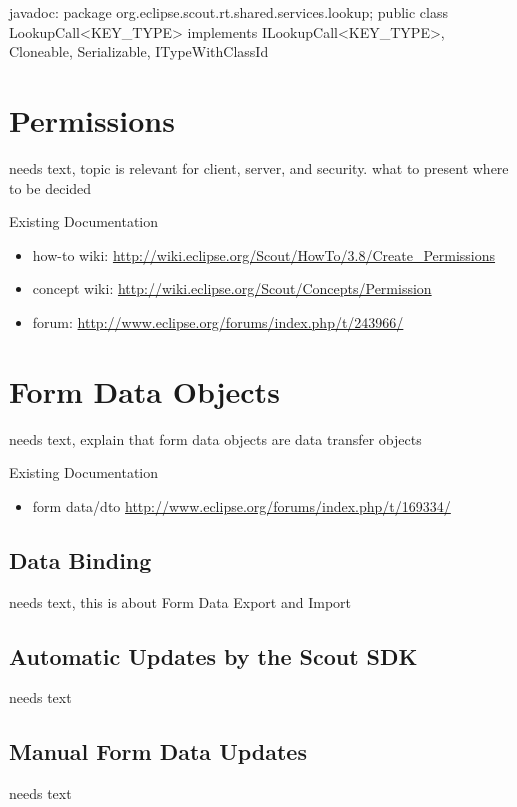 \documentclass[a4paper,10pt,twoside]{book}
\begin{document}
javadoc: 
package org.eclipse.scout.rt.shared.services.lookup;
public class LookupCall<KEY_TYPE> implements ILookupCall<KEY_TYPE>, Cloneable, Serializable, ITypeWithClassId {


\section{Permissions}

needs text, topic is relevant for client, server, and security. what to present where to be decided

\noindent Existing Documentation
\begin{itemize}
  \item how-to wiki: \url{http://wiki.eclipse.org/Scout/HowTo/3.8/Create_Permissions}
  \item concept wiki: \url{http://wiki.eclipse.org/Scout/Concepts/Permission}
  \item forum: \url{http://www.eclipse.org/forums/index.php/t/243966/}
\end{itemize}

\section{Form Data Objects}
needs text, explain that form data objects are data transfer objects

\noindent Existing Documentation
\begin{itemize}
  \item form data/dto \url{http://www.eclipse.org/forums/index.php/t/169334/}
\end{itemize}

\subsection{Data Binding}
needs text, this is about Form Data Export and Import

\subsection{Automatic Updates by the Scout SDK}
needs text

\subsection{Manual Form Data Updates}
needs text

}
\end{document}
